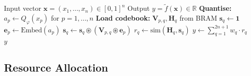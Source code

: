 \begin{algorithm}[h]
\caption{KAT Forward Pass on VCP-1}
\label{alg:hwbridge:kat-forward}
\begin{algorithmic}[1]
\Require Input vector $\mathbf{x} = (x_1, \ldots, x_n) \in [0,1]^n$
\Ensure Output $y = \tilde{f}(\mathbf{x}) \in \mathbb{R}$
\State \textbf{Quantise:} $a_p \gets Q_\varphi(x_p)$ for $p = 1, \ldots, n$
\State \textbf{Load codebook:} $\mathbf{V}_{p,q}, \mathbf{H}_q$ from BRAM
  \State $\mathbf{s}_q \gets \mathbf{1}$ 
    \State $\mathbf{e}_p \gets \mathrm{Embed}(a_p)$ 
    \State $\mathbf{s}_q \gets \mathbf{s}_q \circledast (\mathbf{V}_{p,q} \circledast \mathbf{e}_p)$
  \EndFor
  \State $r_q \gets \mathrm{sim}(\mathbf{H}_q, \mathbf{s}_q)$ 
\EndFor
\State $y \gets \sum_{q=1}^{2n+1} w_q \cdot r_q$ 
\State \Return $y$
\end{algorithmic}
\end{algorithm}

\subsection{Resource Allocation}

